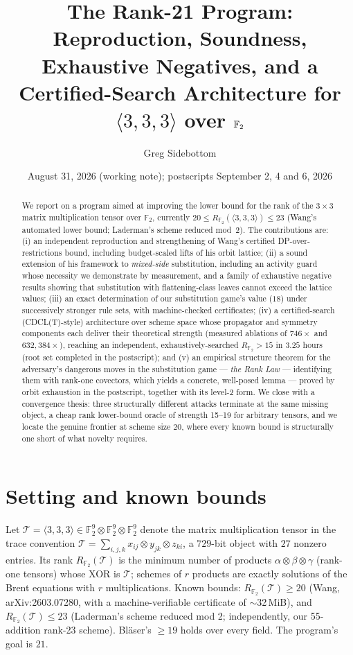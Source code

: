 \documentclass[11pt]{article}
\title{The Rank-21 Program: Reproduction, Soundness, Exhaustive Negatives,
and a Certified-Search Architecture for $\langle 3,3,3\rangle$ over $\F$}
\author{Greg Sidebottom}
\date{August 31, 2026 (working note); postscripts September 2, 4 and 6, 2026}
\theoremstyle{definition}
\newcommand{\F}{\mathbb{F}_2}
\newcommand{\T}{\mathcal{T}}
\begin{document}
\maketitle

\begin{abstract}
We report on a program aimed at improving the lower bound for the rank of the
$3\times 3$ matrix multiplication tensor over $\F$, currently
$20 \le R_{\F}(\langle 3,3,3\rangle) \le 23$ (Wang's automated lower bound;
Laderman's scheme reduced mod~2). The contributions are:
(i) an independent reproduction and strengthening of Wang's certified
DP-over-restrictions bound, including budget-scaled lifts of his orbit
lattice; (ii) a sound extension of his framework to \emph{mixed-side}
substitution, including an activity guard whose necessity we demonstrate by
measurement, and a family of exhaustive negative results showing that
substitution with flattening-class leaves cannot exceed the lattice values;
(iii) an exact determination of our substitution game's value ($18$) under
successively stronger rule sets, with machine-checked certificates;
(iv) a certified-search (CDCL(T)-style) architecture over scheme space whose
propagator and symmetry components each deliver their theoretical strength
(measured ablations of $746\times$ and $632{,}384\times$), reaching an
independent, exhaustively-searched $R_{\F} > 15$ in $3.25$ hours (root set
completed in the postscript); and
(v) an empirical structure theorem for the adversary's dangerous moves in the
substitution game --- \emph{the Rank Law} --- identifying them with rank-one
covectors, which yields a concrete, well-posed lemma --- proved by orbit
exhaustion in the postscript, together with its level-2 form. We close with a
convergence thesis: three structurally different attacks terminate at the
same missing object, a cheap rank lower-bound oracle of strength 15--19 for
arbitrary tensors, and we locate the genuine frontier at scheme size $20$,
where every known bound is structurally one short of what novelty requires.
\end{abstract}

\section{Setting and known bounds}

Let $\T = \langle 3,3,3\rangle \in \F^9 \otimes \F^9 \otimes \F^9$ denote the
matrix multiplication tensor in the trace convention
$\T = \sum_{i,j,k} x_{ij}\otimes y_{jk} \otimes z_{ki}$, a $729$-bit object
with $27$ nonzero entries. Its rank $R_{\F}(\T)$ is the minimum number of
products $\alpha\otimes\beta\otimes\gamma$ (rank-one tensors) whose XOR is
$\T$; schemes of $r$ products are exactly solutions of the Brent equations
with $r$ multiplications. Known bounds:
$R_{\F}(\T)\ge 20$ (Wang, arXiv:2603.07280, with a machine-verifiable
certificate of $\sim$32\,MiB), and $R_{\F}(\T)\le 23$ (Laderman's scheme
reduced mod 2; independently, our 55-addition rank-23 scheme). Bl\"aser's
$\ge 19$ holds over every field. The program's goal is $21$.
\end{document}
